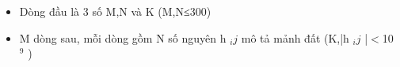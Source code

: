 \begin{itemize}
	\item     Dòng đầu là 3 số M,N và  K (M,N≤300)   
	\item     M dòng sau, mỗi dòng gồm N số nguyên h    $_     ij    $    mô tả mảnh đất (K,|h    $_     ij    $    |$<$10    $^     9    $    )   
\end{itemize}